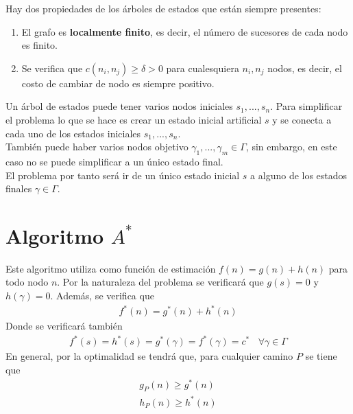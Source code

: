 
\begin{propiedades}
    Hay dos propiedades de los árboles de estados que están siempre presentes:
    \begin{enumerate}
        \item El grafo es \textbf{localmente finito}, es decir, el número de sucesores de cada nodo es finito.
        \item Se verifica que $c(n_i, n_j) \geq \delta > 0$ para cualesquiera $n_i,n_j$ nodos, es decir, el costo de cambiar de nodo es siempre positivo. 
    \end{enumerate}
\end{propiedades}

\begin{observacion}
    Un árbol de estados puede tener varios nodos iniciales $s_1, ..., s_n$. Para simplificar el problema lo que se hace es crear un estado inicial artificial $s$ y se conecta a cada uno de los estados iniciales $s_1, ..., s_n$.\\

    También puede haber varios nodos objetivo $\gamma_1, ..., \gamma_m\in \Gamma$, sin embargo, en este caso no se puede simplificar a un único estado final.\\

    El problema por tanto será ir de un único estado inicial $s$ a alguno de los estados finales $\gamma\in \Gamma$.
\end{observacion}

\section{Algoritmo $A^*$}
Este algoritmo utiliza como función de estimación $f(n)=g(n)+h(n)$ para todo nodo $n$. Por la naturaleza del problema se verificará que $g(s)=0$ y $h(\gamma)=0$. Además, se verifica que 
\begin{gather*}
    f^*(n) = g^*(n) + h^*(n)
\end{gather*}
Donde se verificará también
\begin{gather*}
    f^*(s)=h^*(s) = g^*(\gamma) = f^*(\gamma) = c^* \ \ \ \ \forall \gamma \in \Gamma
\end{gather*}
En general, por la optimalidad se tendrá que, para cualquier camino $P$ se tiene que
\begin{gather*}
    g_P(n)\geq g^*(n)\\
    h_P(n) \geq h^*(n)
\end{gather*}


